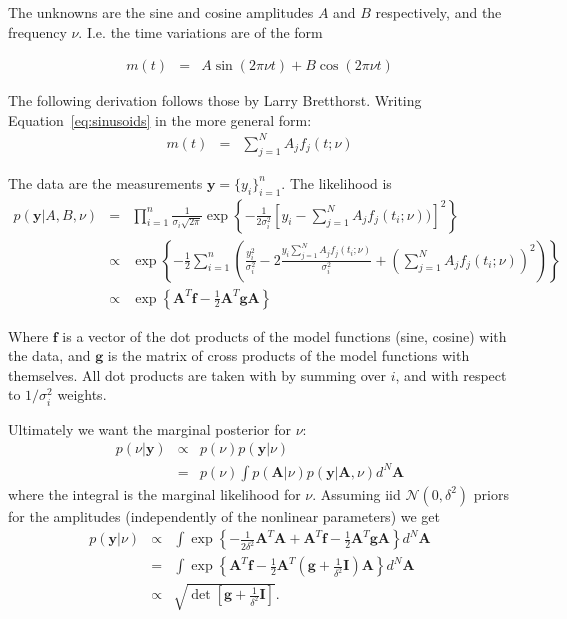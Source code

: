 \documentclass[a4paper, 10pt]{article}
\title{}
\author{Me}
\date{\today}
\begin{document}
\maketitle


The unknowns are the sine and cosine amplitudes $A$ and $B$ respectively,
and the frequency $\nu$. I.e. the time variations are of the form

\begin{eqnarray}
m(t) &=& A\sin(2\pi\nu t) + B\cos(2\pi\nu t)\label{eq:sinusoids}
\end{eqnarray}

The following derivation follows those by Larry Bretthorst. Writing
Equation~\ref{eq:sinusoids} in the more general form:
\begin{eqnarray}
m(t) &=& \sum_{j=1}^N A_j f_j(t; \nu)\label{eq:sinusoids}
\end{eqnarray}

The data are the measurements
$\mathbf{y} = \{y_i\}_{i=1}^n$.
The likelihood is
\begin{eqnarray}
p(\mathbf{y} | A, B, \nu)
&=&
\prod_{i=1}^{n} \frac{1}{\sigma_i \sqrt{2\pi}}
\exp\left\{
-\frac{1}{2\sigma_i^2}
\left[y_i - \sum_{j=1}^N A_j f_j(t_i; \nu))\right]^2
\right\}
\\
&\propto&
\exp\left\{
-\frac{1}{2}\sum_{i=1}^n
\left(
\frac{y_i^2}{\sigma_i^2} - 2\frac{y_i \sum_{j=1}^N A_j f_j(t_i; \nu)}{\sigma_i^2}
+ \left(\sum_{j=1}^N A_j f_j(t_i; \nu)\right)^2
\right)
\right\}\nonumber\\
&\propto&
\exp\left\{
\mathbf{A}^T\mathbf{f}
 -\frac{1}{2} \mathbf{A}^T\mathbf{g}\mathbf{A}
\right\}
\end{eqnarray}

Where $\mathbf{f}$ is a vector of the dot products of the model functions
(sine, cosine) with the data, and $\mathbf{g}$ is the matrix of cross products
of the model functions with themselves. All dot products are taken with
by summing over $i$, and with respect to $1/\sigma_i^2$ weights.

Ultimately we want the marginal posterior for $\nu$:
\begin{eqnarray}
p(\nu | \mathbf{y}) &\propto& p(\nu)p(\mathbf{y} | \nu)\\
&=& p(\nu)\int p(\mathbf{A}|\nu)p(\mathbf{y} | \mathbf{A}, \nu) d^N\mathbf{A}
\end{eqnarray}
where the integral is the marginal likelihood for $\nu$. Assuming
iid $\mathcal{N}(0, \delta^2)$ priors for the amplitudes (independently of
the nonlinear parameters) we get
\begin{eqnarray}
p(\mathbf{y} | \nu)
&\propto& \int\exp\left\{
 -\frac{1}{2\delta^2} \mathbf{A}^T\mathbf{A}
 +\mathbf{A}^T\mathbf{f}
 -\frac{1}{2} \mathbf{A}^T\mathbf{g}\mathbf{A}
\right\} d^N\mathbf{A}\nonumber\\
&=&
\int\exp\left\{
\mathbf{A}^T\mathbf{f}
 -\frac{1}{2} \mathbf{A}^T\left(\mathbf{g} + \frac{1}{\delta^2}\mathbf{I}\right)\mathbf{A}
\right\} d^N\mathbf{A}\nonumber\\
&\propto&
\sqrt{\det\left[\mathbf{g} + \frac{1}{\delta^2}\mathbf{I}\right]}.
\end{eqnarray}
\end{document}
